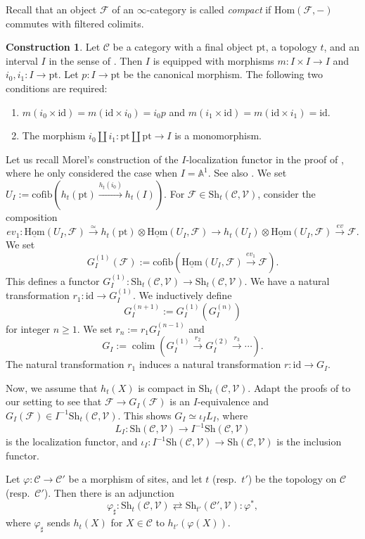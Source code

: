 \documentclass[10pt]{amsart}
\theoremstyle{definition}
\newtheorem{const}[thm]{Construction}
\theoremstyle{remark}
\numberwithin{equation}{subsection}
\newcommand{\A}{\mathbb{A}}
\newcommand{\cC}{\mathcal{C}}
\newcommand{\cF}{\mathcal{F}}
\newcommand{\cV}{\mathcal{V}}
\newcommand{\id}{\mathrm{id}}
\newcommand{\pt}{\mathrm{pt}}
\newcommand{\cofib}{\mathrm{cofib}}
\newcommand{\colimit}{\mathop{\mathrm{colim}}}
\newcommand{\infShv}{\mathrm{Sh}}
\newcommand{\Map}{\mathrm{Hom}}
\newcommand{\uMap}{\underline{\mathrm{Hom}}}
\begin{document}
Recall that an object $\cF$ of an $\infty$-category is called \emph{compact} if $\Map(\cF,-)$ commutes with filtered colimits.

\begin{const}
Let $\cC$ be a category with a final object $\pt$, a topology $t$, and an interval $I$ in the sense of \cite[\S 2.3]{MV}.
Then $I$ is equipped with morphisms $m\colon I\times I\to I$ and $i_0,i_1\colon I\to \pt$.
Let $p\colon I\to \pt$ be the canonical morphism.
The following two conditions are required:
\begin{enumerate}
\item[(i)] $m(i_0\times \id)=m(\id\times i_0)=i_0p$ and $m(i_1\times \id)=m(\id \times i_1)=\id$.
\item[(ii)] The morphism $i_0\amalg i_1\colon \pt \amalg \pt \to I$ is a monomorphism.
\end{enumerate}

Let us recall Morel's construction of the $I$-localization functor in the proof of \cite[Theorem 4.2.1]{zbMATH05052895}, where he only considered the case when $I=\A^1$.
See also \cite[\S 5.2.c]{CD19}.
We set $U_I:=\cofib(h_t(\pt)\xrightarrow{h_t(i_0)} h_t(I))$.
For $\cF\in \infShv_t(\cC,\cV)$, consider the composition
\[
ev_1\colon \uMap(U_I,\cF) \xrightarrow{\simeq} h_t(\pt) \otimes \uMap(U_I,\cF) \to h_t(U_I) \otimes \uMap(U_I,\cF) \xrightarrow{ev} \cF.
\]
We set
\[
G_{I}^{(1)}(\cF)
:=
\cofib(\uMap(U_I,\cF)\xrightarrow{ev_1} \cF).
\]
This defines a functor $G_{I}^{(1)}\colon \infShv_t(\cC,\cV)\to \infShv_t(\cC,\cV)$.
We have a natural transformation $r_1\colon \id \to G_{I}^{(1)}$.
We inductively define
\[
G_{I}^{(n+1)}:=G_{I}^{(1)}(G_{I}^{(n)})
\]
for integer $n\geq 1$.
We set $r_n:=r_1 G_I^{(n-1)}$ and
\[
G_{I}:=\colimit(G_{I}^{(1)}\xrightarrow{r_2} G_{I}^{(2)} \xrightarrow{r_3} \cdots ).
\]
The natural transformation $r_1$ induces a natural transformation $r\colon \id \to G_{I}$.

Now, we assume that $h_t(X)$ is compact in $\infShv_t(\cC,\cV)$.
Adapt the proofs of \cite[Lemma 5.2.27, Proposition 5.2.28]{CD19} to our setting to see that $\cF\to G_I(\cF)$ is an $I$-equivalence and $G_I(\cF)\in I^{-1}\infShv_t(\cC,\cV)$.
This shows $G_{I}\simeq \iota_I L_{I}$, where 
\[
L_I
\colon
\infShv(\cC,\cV) \to I^{-1}\infShv(\cC,\cV)
\]
is the localization functor, and $\iota_I\colon I^{-1}\infShv(\cC,\cV)\to \infShv(\cC,\cV)$ is the inclusion functor.
\end{const}

Let $\varphi\colon \cC\to \cC'$ be a morphism of sites, and let $t$ (resp.\ $t'$) be the topology on $\cC$ (resp.\ $\cC'$).
Then there is an adjunction
\begin{equation}
\varphi_\sharp : \infShv_t(\cC,\cV)\rightleftarrows \infShv_{t'}(\cC',\cV) : \varphi^*,
\end{equation}
where $\varphi_\sharp$ sends $h_t(X)$ for $X\in \cC$ to $h_{t'}(\varphi(X))$.
\end{document}
